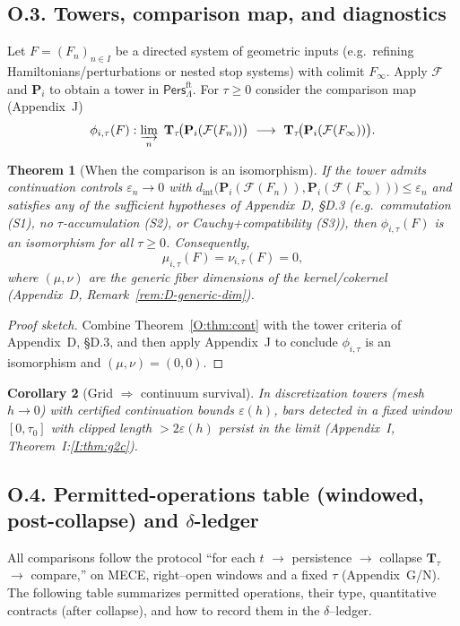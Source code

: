 \documentclass[11pt]{article}
\newcommand{\Pers}{\mathsf{Pers}}
\numberwithin{equation}{section}
\newtheorem{theorem}{Theorem}[section]
\newtheorem{corollary}[theorem]{Corollary}
\theoremstyle{definition}
\providecommand{\n}{\unskip\space}
\begin{document}
\subsection*{O.3. Towers, comparison map, and diagnostics}
Let \(F=(F_n)_{n\in I}\) be a directed system of geometric inputs (e.g.\ refining Hamiltonians/perturbations or nested stop systems) with colimit \(F_\infty\).
Apply \(\mathcal{F}\) and \(\mathbf{P}_i\) to obtain a tower in \(\Pers^{\mathrm{ft}}_\Lambda\).
For \(\tau\ge 0\) consider the comparison map (Appendix~J)
\[
\phi_{i,\tau}(F):\quad\n\varinjlim_n\ \mathbf{T}_\tau\!\big(\mathbf{P}_i(\mathcal{F}(F_n))\big)\ \longrightarrow\ \mathbf{T}_\tau\!\big(\mathbf{P}_i(\mathcal{F}(F_\infty))\big).
\]

\begin{theorem}[When the comparison is an isomorphism]\label{O:thm:phi-iso}
If the tower admits continuation controls \(\varepsilon_n\to 0\) with
\(d_{\mathrm{int}}\!\big(\mathbf{P}_i(\mathcal{F}(F_n)),\mathbf{P}_i(\mathcal{F}(F_\infty))\big)\le \varepsilon_n\)
and satisfies any of the sufficient hypotheses of Appendix~D, §D.3 (e.g.\ commutation (S1), no \(\tau\)-accumulation (S2), or Cauchy+compatibility (S3)), then \(\phi_{i,\tau}(F)\) is an isomorphism for all \(\tau\ge 0\).
Consequently,
\[
\mu_{i,\tau}(F)=\nu_{i,\tau}(F)=0,
\]
where \((\mu,\nu)\) are the generic fiber dimensions of the kernel/cokernel (Appendix~D, Remark~\ref{rem:D-generic-dim}).
\end{theorem}

\begin{proof}[Proof sketch]
Combine Theorem~\ref{O:thm:cont} with the tower criteria of Appendix~D, §D.3, and then apply Appendix~J to conclude \(\phi_{i,\tau}\) is an isomorphism and \((\mu,\nu)=(0,0)\).
\end{proof}

\begin{corollary}[Grid \(\Rightarrow\) continuum survival]
In discretization towers (mesh \(h\to 0\)) with certified continuation bounds \(\varepsilon(h)\), bars detected in a fixed window \([0,\tau_0]\) with clipped length \(>\!2\varepsilon(h)\) persist in the limit (Appendix~I, Theorem~I:\ref{I:thm:g2c}).
\end{corollary}

\subsection*{O.4. Permitted-operations table (windowed, post-collapse) and $\delta$-ledger}
All comparisons follow the protocol “for each \(t\) \(\to\) persistence \(\to\) collapse \(\mathbf{T}_\tau\) \(\to\) compare,” on MECE, right–open windows and a fixed \(\tau\) (Appendix~G/N).
The following table summarizes permitted operations, their type, quantitative contracts (after collapse), and how to record them in the \(\delta\)–ledger.
\end{document}
